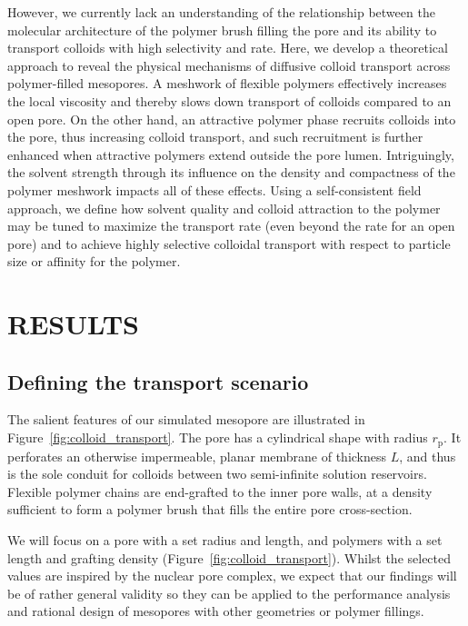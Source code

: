 \documentclass[12pt, a4paper]{article}
\begin{document}
However, we currently lack an understanding of the relationship between the molecular architecture of the polymer brush filling the pore and its ability to transport colloids with high selectivity and rate. Here, we develop a theoretical approach to reveal the physical mechanisms of diffusive colloid transport across polymer-filled mesopores.
A meshwork of flexible polymers effectively increases the local viscosity and thereby slows down transport of colloids compared to an open pore. 
On the other hand, an attractive polymer phase recruits colloids into the pore, thus increasing colloid transport, and such recruitment is further enhanced when attractive polymers extend outside the pore lumen. 
Intriguingly, the solvent strength through its influence on the density and compactness of the polymer meshwork impacts all of these effects. 
Using a self-consistent field approach, we define how solvent quality and colloid attraction to the polymer may be tuned to maximize the transport rate (even beyond the rate for an open pore) and to achieve highly selective colloidal transport with respect to particle size or affinity for the polymer.


\section{RESULTS}


\subsection{Defining the transport scenario}

The salient features of our simulated mesopore are illustrated in Figure~\ref{fig:colloid_transport}.
The pore has a cylindrical shape with radius $r_{\text{p}}$.
It perforates an otherwise impermeable, planar membrane of thickness $L$, and thus is the sole conduit for colloids between two semi-infinite solution reservoirs.
Flexible polymer chains are end-grafted to the inner pore walls, at a density sufficient to form a polymer brush that fills the entire pore cross-section.

We will focus on a pore with a set radius and length, and polymers with a set length and grafting density (Figure~\ref{fig:colloid_transport}).
Whilst the selected values are inspired by the nuclear pore complex, we expect that our findings will be of rather general validity so they can be applied to the performance analysis and rational design of mesopores with other geometries or polymer fillings.
\end{document}
